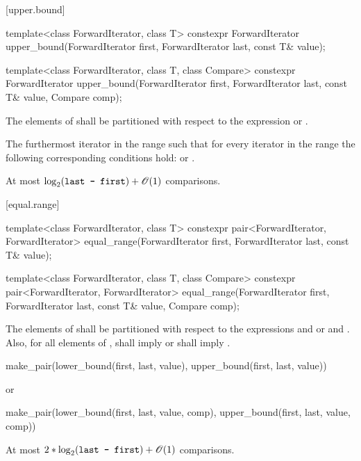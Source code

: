 [upper.bound]{}

%
\begin{itemdecl}
template<class ForwardIterator, class T>
  constexpr ForwardIterator
    upper_bound(ForwardIterator first, ForwardIterator last,
                const T& value);

template<class ForwardIterator, class T, class Compare>
  constexpr ForwardIterator
    upper_bound(ForwardIterator first, ForwardIterator last,
                const T& value, Compare comp);
\end{itemdecl}

\begin{itemdescr}
\pnum
\requires
The elements
of
shall be partitioned with respect to the expression
or
.

\pnum
\returns
The furthermost iterator
in the range
such that for every iterator
in the range
the following corresponding conditions hold:
or
.

\pnum
\complexity
At most
$\log_2(\texttt{last - first}) + \mathscr{O}(1)$
comparisons.
\end{itemdescr}

[equal.range]{}

%
\begin{itemdecl}
template<class ForwardIterator, class T>
  constexpr pair<ForwardIterator, ForwardIterator>
    equal_range(ForwardIterator first,
                ForwardIterator last, const T& value);

template<class ForwardIterator, class T, class Compare>
  constexpr pair<ForwardIterator, ForwardIterator>
    equal_range(ForwardIterator first,
                ForwardIterator last, const T& value,
                Compare comp);
\end{itemdecl}

\begin{itemdescr}
\pnum
\requires
The elements
of
shall be partitioned with respect to the expressions
and
or
and
.
Also, for all elements
of
\tcode{[first, last)},
shall imply
or
shall imply
.

\pnum
\returns
\begin{codeblock}
make_pair(lower_bound(first, last, value),
          upper_bound(first, last, value))
\end{codeblock}
or
\begin{codeblock}
make_pair(lower_bound(first, last, value, comp),
          upper_bound(first, last, value, comp))
\end{codeblock}

\pnum
\complexity
At most
$2 * \log_2(\texttt{last - first}) + \mathscr{O}(1)$
comparisons.
\end{itemdescr}

